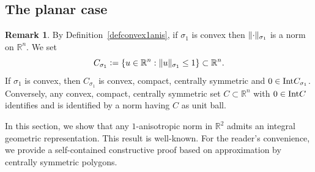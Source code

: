 \documentclass{article}
\numberwithin{equation}{section}
\theoremstyle{plain}%
\theoremstyle{definition}
\newtheorem{rem}[theorem]{Remark}
\theoremstyle{definition}
\newcommand{\rgrande}{\mathbb{R}}
\newcommand{\interno}{{\rm Int}}
\DeclarePairedDelimiter{\norma}{\lVert}{\rVert} %
\begin{document}
\subsection{The planar case}\label{sec:planar_case}
\begin{rem}
By Definition~\ref{defconvex1anis}, if $\sigma_1$ is convex then $\norma{\cdot}_{\sigma_1}$ is a norm on $\rgrande^n$. We set $$C_{\sigma_1} \vcentcolon = \{ u \in \rgrande^n :  \norma{u}_{\sigma_1} \le 1 \} \subset \rgrande^n.$$ If $\sigma_1$ is convex, then $C_{\sigma_1}$ is convex, compact, centrally symmetric and $0\in \interno C_{\sigma_1}$. Conversely, any convex, compact, centrally symmetric set $C \subset \rgrande^n$ with $0\in\interno C$ identifies and is identified by a norm having $C$ as unit ball.
\end{rem}
In this section, we show that any $1$-anisotropic norm in $\rgrande^2$ admits an integral geometric representation. This result is well-known. For the reader’s convenience, we provide a self-contained constructive proof based on approximation by centrally symmetric polygons.
\end{document}

